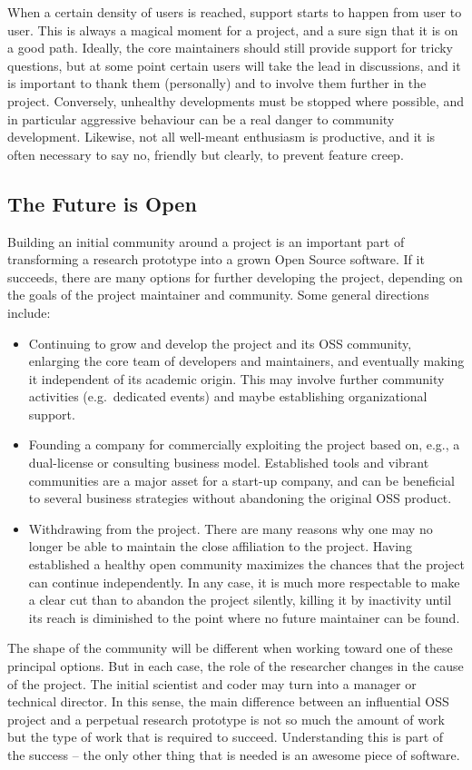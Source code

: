 When a certain density of users is reached, support starts to happen from user to user. This is always a magical moment for a project, and a sure sign that it is on a good path. Ideally, the core maintainers should still provide support for tricky questions, but at some point certain users will take the lead in discussions, and it is important to thank them (personally) and to involve them further in the project. Conversely, unhealthy developments must be stopped where possible, and in particular aggressive behaviour can be a real danger to community development. Likewise, not all well-meant enthusiasm is productive, and it is often necessary to say no, friendly but clearly, to prevent feature creep.

\subsection*{The Future is Open}

Building an initial community around a project is an important part of transforming a research prototype into a grown Open Source software. If it succeeds, there are many options for further developing the project, depending on the goals of the project maintainer and community. Some general directions include:
%
\begin{itemize}
\item Continuing to grow and develop the project and its OSS community, enlarging the core team of developers and maintainers, and eventually making it independent of its academic origin. This may involve further community activities (e.g.\ dedicated events) and maybe establishing organizational support.
%
\item Founding a company for commercially exploiting the project based on, e.g., a dual-license or consulting business model. Established tools and vibrant communities are a major asset for a start-up company, and can be beneficial to several business strategies without abandoning the original OSS product.
%
\item Withdrawing from the project. There are many reasons why one may no longer be able to maintain the close affiliation to the project. Having established a healthy open community maximizes the chances that the project can continue independently. In any case, it is much more respectable to make a clear cut than to abandon the project silently, killing it by inactivity until its reach is diminished to the point where no future maintainer can be found.
\end{itemize}
%
The shape of the community will be different when working toward one of these principal options. But in each case, the role of the researcher changes in the cause of the project. The initial scientist and coder may turn into a manager or technical director. In this sense, the main difference between an influential OSS project and a perpetual research prototype is not so much the amount of work but the type of work that is required to succeed. Understanding this is part of the success -- the only other thing that is needed is an awesome piece of software.

